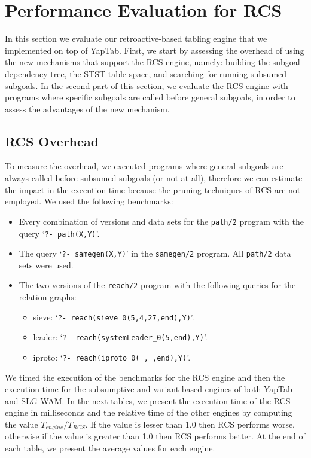 

\section{Performance Evaluation for RCS}

In this section we evaluate our retroactive-based tabling engine that we implemented on
top of YapTab. First, we start by assessing the overhead of using the new mechanisms that
support the RCS engine, namely: building the subgoal dependency tree, the STST table space,
and searching for running subsumed subgoals. In the second part of this section, we evaluate
the RCS engine with programs where specific subgoals are called before general subgoals, in
order to assess the advantages of the new mechanism.

\subsection{RCS Overhead}

To measure the overhead, we executed programs where general subgoals are always called before
subsumed subgoals (or not at all), therefore we can estimate the impact in the execution time
because the pruning techniques of RCS are not employed.
We used the following benchmarks:

\begin{itemize}
   \item Every combination of versions and data sets for the \texttt{path/2} program with the query `\texttt{?-~path(X,Y)}'.
   
   \item The query `\texttt{?-~samegen(X,Y)}' in the \texttt{samegen/2} program. All \texttt{path/2} data
   sets were used.
   
   \item The two versions of the \texttt{reach/2} program with the following queries for the relation graphs:

   \begin{itemize}
      \item sieve: `\texttt{?-~reach(sieve\_0(5,4,27,end),Y)}'.
      \item leader: `\texttt{?-~reach(systemLeader\_0(5,end),Y)}'.
      \item iproto: `\texttt{?-~reach(iproto\_0(\_,\_,end),Y)}'.
   \end{itemize}
\end{itemize}

We timed the execution of the benchmarks for the RCS engine and then the execution time
for the subsumptive and variant-based engines of both YapTab and SLG-WAM. In the next tables,
we present the execution time of the RCS engine in milliseconds and the relative time
of the other engines by computing the value $T_{engine} / T_{RCS}$.
If the value is lesser than 1.0 then RCS performs worse, otherwise if the value is greater than
1.0 then RCS performs better. At the end of each table, we present the average values for
each engine.

